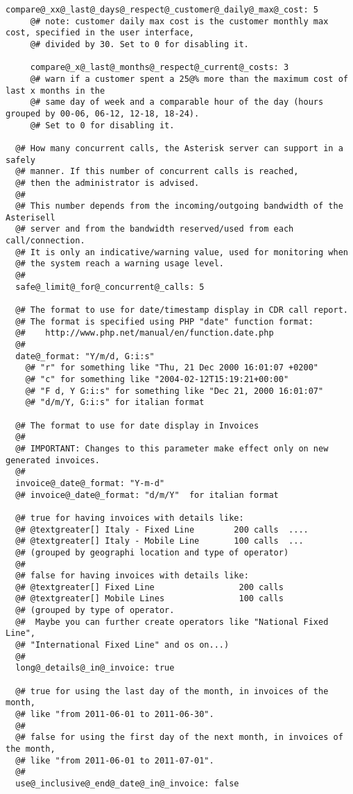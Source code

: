 \documentclass[letterpaper,10pt,english]{sphinxmanual}
\begin{document}
\begin{Verbatim}[commandchars=@\[\]]
     compare@_xx@_last@_days@_respect@_customer@_daily@_max@_cost: 5
     @# note: customer daily max cost is the customer monthly max cost, specified in the user interface,
     @# divided by 30. Set to 0 for disabling it.

     compare@_x@_last@_months@_respect@_current@_costs: 3
     @# warn if a customer spent a 25@% more than the maximum cost of last x months in the
     @# same day of week and a comparable hour of the day (hours grouped by 00-06, 06-12, 12-18, 18-24).
     @# Set to 0 for disabling it.

  @# How many concurrent calls, the Asterisk server can support in a safely
  @# manner. If this number of concurrent calls is reached, 
  @# then the administrator is advised.
  @# 
  @# This number depends from the incoming/outgoing bandwidth of the Asterisell
  @# server and from the bandwidth reserved/used from each call/connection.
  @# It is only an indicative/warning value, used for monitoring when
  @# the system reach a warning usage level.
  @# 
  safe@_limit@_for@_concurrent@_calls: 5

  @# The format to use for date/timestamp display in CDR call report.
  @# The format is specified using PHP "date" function format:
  @#    http://www.php.net/manual/en/function.date.php
  @#
  date@_format: "Y/m/d, G:i:s"
    @# "r" for something like "Thu, 21 Dec 2000 16:01:07 +0200"
    @# "c" for something like "2004-02-12T15:19:21+00:00"
    @# "F d, Y G:i:s" for something like "Dec 21, 2000 16:01:07"
    @# "d/m/Y, G:i:s" for italian format

  @# The format to use for date display in Invoices
  @#
  @# IMPORTANT: Changes to this parameter make effect only on new generated invoices.
  @#
  invoice@_date@_format: "Y-m-d"
  @# invoice@_date@_format: "d/m/Y"  for italian format

  @# true for having invoices with details like:
  @# @textgreater[] Italy - Fixed Line        200 calls  ....
  @# @textgreater[] Italy - Mobile Line       100 calls  ...
  @# (grouped by geographi location and type of operator)
  @#
  @# false for having invoices with details like:
  @# @textgreater[] Fixed Line                 200 calls
  @# @textgreater[] Mobile Lines               100 calls
  @# (grouped by type of operator. 
  @#  Maybe you can further create operators like "National Fixed Line", 
  @# "International Fixed Line" and os on...)
  @#
  long@_details@_in@_invoice: true

  @# true for using the last day of the month, in invoices of the month,
  @# like "from 2011-06-01 to 2011-06-30".
  @#
  @# false for using the first day of the next month, in invoices of the month, 
  @# like "from 2011-06-01 to 2011-07-01".
  @# 
  use@_inclusive@_end@_date@_in@_invoice: false


\end{Verbatim}
\end{document}
